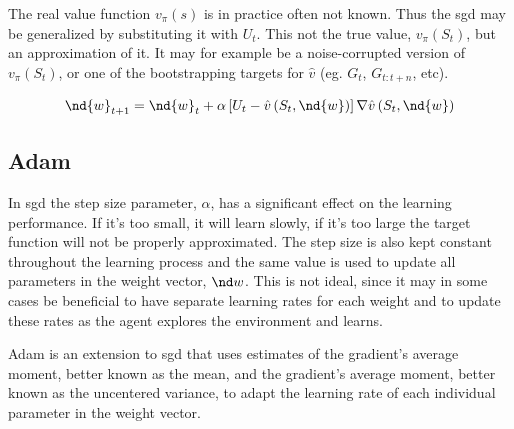 The real value function $v_{\pi}\left(s\right)$ is in practice often not known. Thus the \gls{sgd} may be generalized by substituting it with $U_t$. This not the true value, $v_{\pi}\left(S_t\right)$, but an approximation of it. It may for example be a noise-corrupted version of $v_{\pi}\left(S_t\right)$, or one of the bootstrapping targets for $\hat{v}$ (eg. $G_t$, $G_{t:t+n}$, etc).

\begin{equation}
  \nd{w}_{t+1} = \nd{w}_t + \alpha \left[U_t - \hat{v}\left(S_t, \nd{w}\right) \right] \nabla \hat{v}\left(S_t, \nd{w}\right)
  \label{eq:vpist_w_update}
\end{equation}

\subsection{Adam}
In \acrshort{sgd} the step size parameter, $\alpha$, has a significant effect on the learning performance. If it's too small, it will learn slowly, if it's too large the target function will not be properly approximated. The step size is also kept constant throughout the learning process and the same value is used to update all parameters in the weight vector, $\nd w$. This is not ideal, since it may in some cases be beneficial to have separate learning rates for each weight and to update these rates as the agent explores the environment and learns.

Adam is an extension to \acrshort{sgd} that uses estimates of the gradient's average  moment, better known as the mean, and the gradient's average  moment, better known as the uncentered variance, to adapt the learning rate of each individual parameter in the weight vector.

